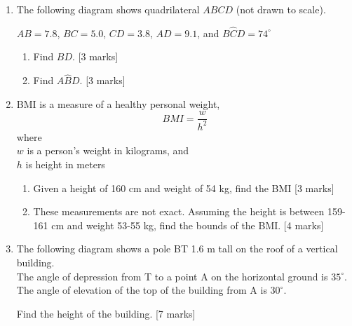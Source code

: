 \documentclass[12pt, twoside]{article}
\begin{document}
\begin{enumerate}
\item The following diagram shows quadrilateral $ABCD$ (not drawn to scale).
  \begin{center}
    \end{center} 
    $AB=7.8$, $BC=5.0$, $CD=3.8$, $AD=9.1$, and $B\hat{C}D=74^\circ$
    \begin{enumerate}
      \item Find $BD$. \hfill [3 marks]
      \item Find $A\hat{B}D$. \hfill [3 marks]
    \end{enumerate}

\newpage

\item BMI is a measure of a healthy personal weight, 
  \[\displaystyle BMI = \frac{w}{h^2}\]
    where \\
    $w$ is a person's weight in kilograms, and \\
    $h$ is height in meters
    \begin{enumerate} 
        \item Given a height of 160 cm and weight of 54 kg, find the BMI  \hfill [3 marks]
        \item These measurements are not exact. Assuming the height is between 159-161 cm and weight 53-55 kg, find the bounds of the BMI.  \hfill [4 marks]
      \end{enumerate}

\item The following diagram shows a pole BT 1.6 m tall on the roof of a vertical building. \\[0.25cm]
      The angle of depression from T to a point A on the horizontal ground is  
      $35^\circ$. \\[0.25cm]
      The angle of elevation of the top of the building from A is  
      $30^\circ$. 
        \begin{center}
          \end{center}
          Find the height of the building.  \hfill [7 marks]


\end{enumerate}
\end{document}
